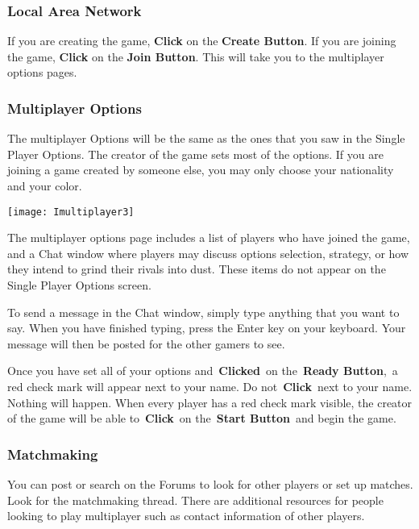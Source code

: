\subsubsection{Local Area Network}

If you are creating the game, \textbf{Click} on the \textbf{Create Button}. If you are joining the game, \textbf{Click} on the \textbf{Join Button}. This will take you to the multiplayer options pages.

\subsubsection{Multiplayer Options}

The multiplayer Options will be the same as the ones that you saw in the Single Player Options. The creator of the game sets most of the options. If you are joining a game created by someone else, you may only choose your nationality and your color.

\begin{center}
	\texttt{[image: Imultiplayer3]}
\end{center}

The multiplayer options page includes a list of players who have joined the game, and a Chat window where players may discuss options selection, strategy, or how they intend to grind their rivals into dust. These items do not appear on the Single Player Options screen.

To send a message in the Chat window, simply type anything that you want to say. When you have finished typing, press the Enter key on your keyboard. Your message will then be posted for the other gamers to see.

Once you have set all of your options and \textbf{Clicked} on the \textbf{Ready Button}, a red check mark will appear next to your name. Do not \textbf{Click} next to your name. Nothing will happen. When every player has a red check mark visible, the creator of the game will be able to \textbf{Click} on the \textbf{Start Button} and begin the game.

\subsubsection{Matchmaking}


You can post or search on the Forums to look for other players or set up matches. Look for the matchmaking thread. There are additional resources for people looking to play multiplayer such as contact information of other players.

